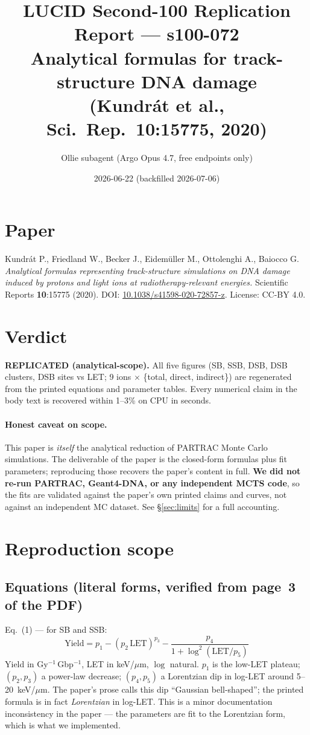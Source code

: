 \documentclass[11pt]{article}
\title{LUCID Second-100 Replication Report --- s100-072\\
\large Analytical formulas for track-structure DNA damage\\ (Kundr\'at et al., Sci.\ Rep.\ 10:15775, 2020)}
\author{Ollie subagent (Argo Opus 4.7, free endpoints only)}
\date{2026-06-22 (backfilled 2026-07-06)}
\begin{document}
\maketitle

\section{Paper}
Kundr\'at P., Friedland W., Becker J., Eidem\"uller M., Ottolenghi A., Baiocco G.
\emph{Analytical formulas representing track-structure simulations on DNA damage induced by protons and light ions at radiotherapy-relevant energies.}
Scientific Reports \textbf{10}:15775 (2020).
DOI: \href{https://doi.org/10.1038/s41598-020-72857-z}{10.1038/s41598-020-72857-z}.
License: CC-BY 4.0.

\section{Verdict}
\textbf{REPLICATED (analytical-scope).} All five figures (SB, SSB, DSB, DSB clusters, DSB sites vs LET; 9 ions $\times$ \{total, direct, indirect\}) are regenerated from the printed equations and parameter tables. Every numerical claim in the body text is recovered within 1--3\% on CPU in seconds.

\paragraph{Honest caveat on scope.} This paper is \emph{itself} the analytical reduction of PARTRAC Monte Carlo simulations. The deliverable of the paper is the closed-form formulas plus fit parameters; reproducing those recovers the paper's content in full. \textbf{We did not re-run PARTRAC, Geant4-DNA, or any independent MCTS code}, so the fits are validated against the paper's own printed claims and curves, not against an independent MC dataset. See \S\ref{sec:limits} for a full accounting.

\section{Reproduction scope}

\subsection{Equations (literal forms, verified from page~3 of the PDF)}

Eq.~(1) --- for SB and SSB:
\[
\text{Yield} = p_1 - (p_2\,\text{LET})^{p_3} - \frac{p_4}{1 + \log^2(\text{LET}/p_5)}
\]
Yield in Gy$^{-1}$\,Gbp$^{-1}$, LET in keV/$\mu$m, $\log$ natural. $p_1$ is the low-LET plateau; $(p_2,p_3)$ a power-law decrease; $(p_4,p_5)$ a Lorentzian dip in log-LET around 5--20~keV/$\mu$m. The paper's prose calls this dip ``Gaussian bell-shaped''; the printed formula is in fact \emph{Lorentzian} in log-LET. This is a minor documentation inconsistency in the paper --- the parameters are fit to the Lorentzian form, which is what we implemented.
\end{document}
